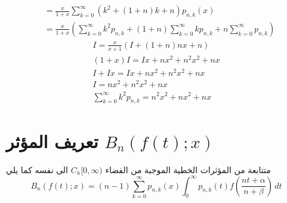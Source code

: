 \begin{english}
\begin{enumerate}[label=\arabic*)]
\begin{align*}
		&= \frac{x}{1+x} \sum_{k=0}^{\infty} (k^2 + (1+n)k + n)p_{n,k}(x)\\
		&= \frac{x}{1+x} \left(
		\sum_{k=0}^{\infty} k^2 p_{n,k} 
		+ (1+n)\sum_{k=0}^{\infty} k p_{n,k} 
		+n\sum_{k=0}^{\infty} p_{n,k} 
		\right)
	\end{align*}
	\begin{gather*}
		I = \frac{x}{x+1} (I + (1+n)nx + n)\\
		(1+x) I = Ix + nx^2 + n^2x^2 + nx\\
		I + I x = Ix + nx^2 + n^2x^2 + nx\\
		I = nx^2 + n^2x^2 + nx\\
		\sum_{k=0}^{\infty}k^2 p_{n,k} = n^2 x^2 + nx^2 + nx
	\end{gather*}
\end{enumerate}
\end{english}

\section{تعريف المؤثر $B_n(f(t); x)$}
متتابعة من المؤثرات الخطية الموجبة من الفضاء $C_h[0, \infty)$ الى نفسه كما يلي
\[
B_n(f(t); x) = (n-1)\sum_{k=0}^{\infty} p_{n, k}(x) \int_{0}^{\infty} p_{n, k}(t) f\left(\frac{nt + \alpha}{n + \beta}\right) \, dt
\]

